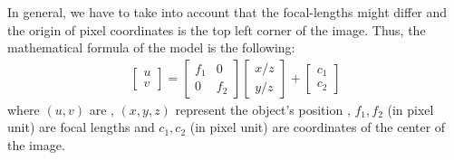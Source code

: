 In general, we have to take into account that the focal-lengths might differ and the origin of pixel coordinates is the top left corner of the image. Thus, the mathematical formula of the model is the following:
\begin{align}
	\label{form:pinhole}
\begin{bmatrix}
	u \\
	v
\end{bmatrix} = \begin{bmatrix}
f_1 & 0 \\
0 & f_2 
\end{bmatrix} \begin{bmatrix}
x/z\\
y/z
\end{bmatrix} + \begin{bmatrix}
c_1 \\ c_2
\end{bmatrix}
\end{align}
where $(u, v)$ are , $(x,y,z)$ represent the object's position , $f_1, f_2$ (in pixel unit) are focal lengths and $c_1, c_2$ (in pixel unit) are coordinates of the center of the image.


